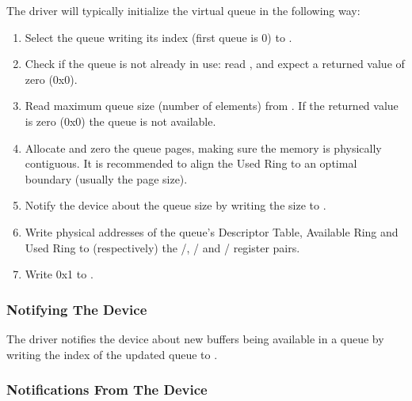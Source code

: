 The driver will typically initialize the virtual queue in the following way:

\begin{enumerate}
\item Select the queue writing its index (first queue is 0) to
   .

\item Check if the queue is not already in use: read ,
   and expect a returned value of zero (0x0).

\item Read maximum queue size (number of elements) from
   . If the returned value is zero (0x0) the
   queue is not available.

\item Allocate and zero the queue pages, making sure the memory
   is physically contiguous. It is recommended to align the
   Used Ring to an optimal boundary (usually the page size).

\item Notify the device about the queue size by writing the size to
   .

\item Write physical addresses of the queue's Descriptor Table,
   Available Ring and Used Ring to (respectively) the
   /,
   / and
   / register pairs.

\item Write 0x1 to .
\end{enumerate}

\subsubsection{Notifying The Device}\label{sec:Virtio Transport Options / Virtio Over MMIO / MMIO-specific Initialization And Device Operation / Notifying The Device}

The driver notifies the device about new buffers being available in
a queue by writing the index of the updated queue to .

\subsubsection{Notifications From The Device}\label{sec:Virtio Transport Options / Virtio Over MMIO / MMIO-specific Initialization And Device Operation / Notifications From The Device}

